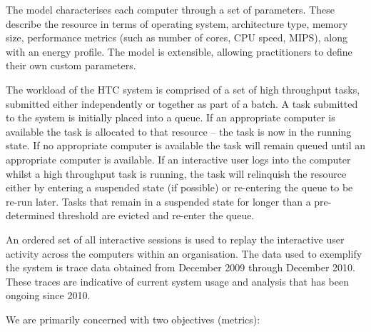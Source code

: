 \documentclass[10pt, conference, compsocconf]{IEEEtran}
\begin{document}
The model characterises each computer through a set of parameters. These describe the resource in terms of operating system, architecture type, memory size, performance metrics (such as number of cores, CPU speed, MIPS), along with an energy profile. The model is extensible, allowing practitioners to define their own custom parameters.

The workload of the HTC system is comprised of a set of high throughput tasks,  submitted either independently or together as part of a batch. A task submitted to the system is initially placed into a queue. If an appropriate computer is available the task is allocated to that resource -- the task is now in the running state. If no appropriate computer is available the task will remain queued until an appropriate computer is available. If an interactive user logs into the computer whilst a high throughput task is running, the task will relinquish the resource either by entering a suspended state (if possible) or re-entering the queue to be re-run later. Tasks that remain in a suspended state for longer than a pre-determined threshold are evicted and re-enter the queue.

An ordered set of all interactive sessions is used to replay the interactive user activity across the computers within an organisation. The data used to exemplify the system is trace data obtained from December 2009 through December 2010. These traces are indicative of current system usage and analysis that has been ongoing since 2010.

We are primarily concerned with two objectives (metrics):%
\end{document}
